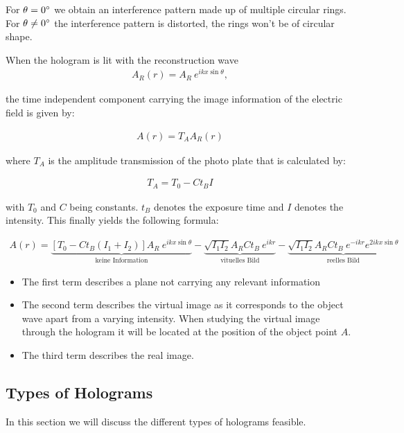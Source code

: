 For $\theta=0^\circ$ we obtain an interference pattern made up of multiple circular rings. For  $\theta\neq0^\circ$ the interference pattern is distorted, the rings won't be of circular shape.



When the hologram is lit with the reconstruction wave
\begin{align}
A_R(r)=A_R\ e^{ikx \sin\theta},
\end{align}


the time independent component carrying the image information of the electric field is given by:


\begin{align}
A(r)=T_AA_R(r)
\end{align}


where $T_A$ is the amplitude transmission of the photo plate that is calculated by:


\begin{align}
T_A=T_0-Ct_BI
\end{align}


with
$T_0$ and $C$ being constants. $t_B$ denotes the exposure time and $I$ denotes the intensity.
This finally yields the following formula:

\begin{align}
A(r)=\underbrace{[T_0-Ct_B(I_1+I_2)]A_R\ e^{ikx \sin\theta}}_{\mbox{keine Information}} - \underbrace{\sqrt{I_1I_2}A_RCt_B\ e^{ikr}}_{\mbox{vituelles Bild}} - \underbrace{\sqrt{I_1I_2}A_RCt_B\ e^{-ikr}e^{2ikx \sin\theta}}_{\mbox{reelles Bild}}
\end{align}



\begin{itemize}
	\item The first term describes a plane not carrying any relevant information
	\item The second term describes the virtual image as it corresponds to the object wave apart from a varying intensity. When studying the virtual image through the hologram it will be located at the position of the object point $A$.
	\item The third term describes the real image.
\end{itemize}

\subsection{Types of Holograms}

In this section we will discuss the different types of holograms feasible.

